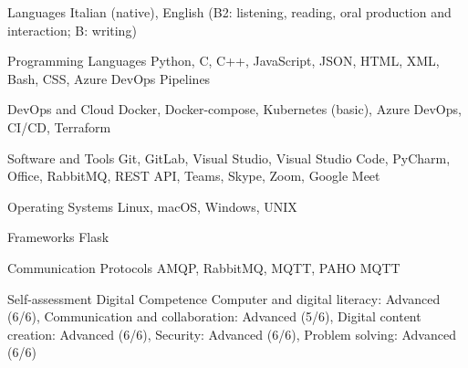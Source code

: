 \cvskill
{Languages} %
{Italian (native), English (B2: listening, reading, oral production and interaction; B: writing)}




\begin{cvskills}


\cvskill
{Programming Languages} %
{Python, C, C++, JavaScript, JSON, HTML, XML, Bash, CSS, Azure DevOps Pipelines} %


\cvskill
{DevOps and Cloud} %
{Docker, Docker-compose, Kubernetes (basic), Azure DevOps, CI/CD, Terraform} %


\cvskill
{Software and Tools} %
{Git, GitLab, Visual Studio, Visual Studio Code, PyCharm, Office, RabbitMQ, REST API, Teams, Skype, Zoom, Google Meet} %


\cvskill
{Operating Systems} %
{Linux, macOS, Windows, UNIX} %


\cvskill
{Frameworks} %
{Flask} %


\cvskill
{Communication Protocols} %
{AMQP, RabbitMQ, MQTT, PAHO MQTT} %


\cvskill
{Self-assessment Digital Competence} %
{Computer and digital literacy: Advanced (6/6), Communication and collaboration: Advanced (5/6), Digital content creation: Advanced (6/6), Security: Advanced (6/6), Problem solving: Advanced (6/6)} %


\end{cvskills}

